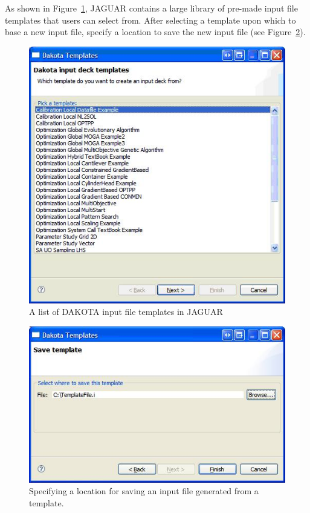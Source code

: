 As shown in Figure~\ref{fig:input:jag_template1}, JAGUAR contains a
large library of pre-made input file templates that users can select
from.  After selecting a template upon which to base a new input file,
specify a location to save the new input file (see
Figure~\ref{fig:input:jag_template2}).
\begin{figure}
  \centering
  \includegraphics[scale=0.6]{images/jag_template1}
  \caption{A list of DAKOTA input file templates in JAGUAR}
  \label{fig:input:jag_template1}
\end{figure}
\begin{figure}
  \centering
  \includegraphics[scale=0.6]{images/jag_template2}
  \caption{Specifying a location for saving an input file generated
    from a template.}
  \label{fig:input:jag_template2}
\end{figure}

